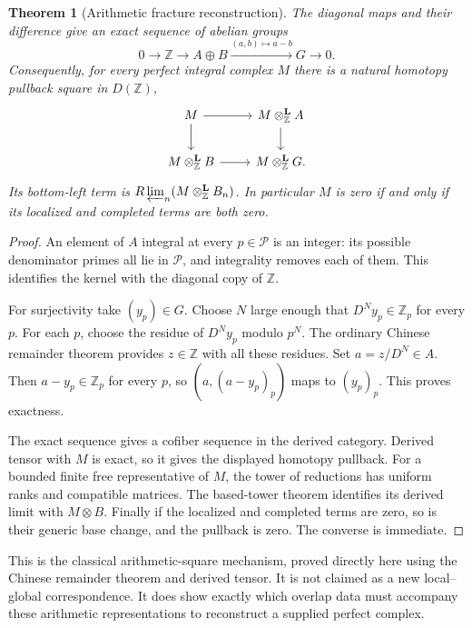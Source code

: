 \documentclass[11pt]{article}
\newtheorem{theorem}{Theorem}[section]
\theoremstyle{definition}
\theoremstyle{remark}
\begin{document}
\begin{theorem}[Arithmetic fracture reconstruction]\label{thm:arithmetic-fracture}
The diagonal maps and their difference give an exact sequence of abelian groups
\[
 0\longrightarrow\mathbb Z
 \longrightarrow A\oplus B
 \xrightarrow{(a,b)\mapsto a-b}G
 \longrightarrow0.
\]
Consequently, for every perfect integral complex $M$ there is a natural homotopy pullback square in $D(\mathbb Z)$,
\[
 \begin{tikzcd}
 M\arrow[r]\arrow[d]&M\otimes^{\mathbf L}_{\mathbb Z}A\arrow[d]\\
 M\otimes^{\mathbf L}_{\mathbb Z}B\arrow[r]&M\otimes^{\mathbf L}_{\mathbb Z}G.
 \end{tikzcd}
\]
Its bottom-left term is $R\varprojlim_n(M\otimes^{\mathbf L}_{\mathbb Z}B_n)$. In particular $M$ is zero if and only if its localized and completed terms are both zero.
\end{theorem}
\begin{proof}
An element of $A$ integral at every $p\in\mathcal P$ is an integer: its possible denominator primes all lie in $\mathcal P$, and integrality removes each of them. This identifies the kernel with the diagonal copy of $\mathbb Z$.

For surjectivity take $(y_p)\in G$. Choose $N$ large enough that $D^Ny_p\in\mathbb Z_p$ for every $p$. For each $p$, choose the residue of $D^Ny_p$ modulo $p^N$. The ordinary Chinese remainder theorem provides $z\in\mathbb Z$ with all these residues. Set $a=z/D^N\in A$. Then $a-y_p\in\mathbb Z_p$ for every $p$, so $(a,(a-y_p)_p)$ maps to $(y_p)_p$. This proves exactness.

The exact sequence gives a cofiber sequence in the derived category. Derived tensor with $M$ is exact, so it gives the displayed homotopy pullback. For a bounded finite free representative of $M$, the tower of reductions has uniform ranks and compatible matrices. The based-tower theorem identifies its derived limit with $M\otimes B$. Finally if the localized and completed terms are zero, so is their generic base change, and the pullback is zero. The converse is immediate.
\end{proof}

This is the classical arithmetic-square mechanism, proved directly here using the Chinese remainder theorem and derived tensor. It is not claimed as a new local--global correspondence. It does show exactly which overlap data must accompany these arithmetic representations to reconstruct a supplied perfect complex.
\end{document}

